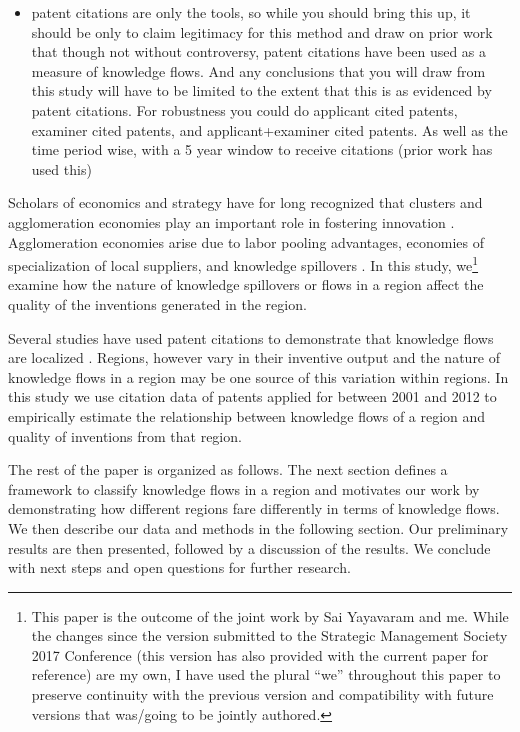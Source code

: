 \documentclass[12pt,letterpaper]{article}
\begin{document}
\begin{itemize}
\item patent citations are only the tools, so while you should bring this up, it should be only to claim legitimacy for this method and draw on prior work that though not without controversy, patent citations have been used as a measure of knowledge flows. And any conclusions that you will draw from this study will have to be limited to the extent that this is as evidenced by patent citations. For robustness you could do  applicant cited patents, examiner cited patents, and applicant+examiner cited patents. As well as the time period wise, with a 5 year window to receive citations (prior work has used this)
\end{itemize}

Scholars of economics and strategy have for long recognized that clusters and agglomeration economies play an important role in fostering innovation \citep{Marshall1890, Porter1990}. Agglomeration economies arise due to labor pooling advantages, economies of specialization of local suppliers, and knowledge spillovers \citep{Porter1990, Krugman1991a}. In this study, we\footnote{This paper is the outcome of the joint work by Sai Yayavaram and me. While the changes since the version submitted to the Strategic Management Society 2017 Conference (this version has also provided with the current paper for reference) are my own, I have used the plural ``we'' throughout this paper to preserve continuity with the previous version and compatibility with future versions that was/going to be jointly authored.} examine how the nature of knowledge spillovers or flows in a region affect the quality of the inventions generated in the region.\par
Several studies have used patent citations to demonstrate that knowledge flows are localized \citep*{Jaffe1993, Almeida1999, Alcacer2006a}. Regions, however vary in their inventive output \citep*{Agrawal2014} and the nature of knowledge flows in a region may be one source of this variation within regions. In this study we use citation data of patents applied for between 2001 and 2012 to empirically estimate the relationship between knowledge flows of a region and quality of inventions from that region. \par
The rest of the paper is organized as follows. The next section defines a framework to classify knowledge flows in a region and motivates our work by demonstrating how different regions fare differently in terms of knowledge flows. We then describe our data and methods in the following section. Our preliminary results are then presented, followed by a discussion of the results. We conclude with next steps and open questions for further research.
\end{document}
